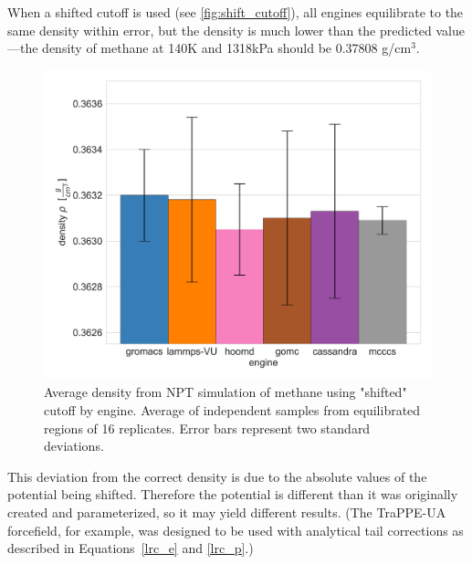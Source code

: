 When a shifted cutoff is used (see \autoref{fig:shift_cutoff}), all engines equilibrate to the same density within error, but the density is much lower than the predicted value---the density of methane at 140K and 1318kPa should be 0.37808 g/cm$^3$\cite{NISTwebbook}.
\begin{figure}[h!]
    \centering
    \includegraphics[width=0.8\linewidth,keepaspectratio]{figures/rep_study/shift_cutoff.png}
    \caption{Average density from NPT simulation of methane using "shifted" cutoff by engine. Average of independent samples from equilibrated regions of 16 replicates. Error bars represent two standard deviations.}\label{fig:shift_cutoff}
\end{figure}
This deviation from the correct density is due to the absolute values of the potential being shifted. 
Therefore the potential is different than it was originally created and parameterized, so it may yield different results.
(The TraPPE-UA forcefield, for example, was designed to be used with analytical tail corrections as described in Equations~\eqref{lrc_e} and \eqref{lrc_p}.)

